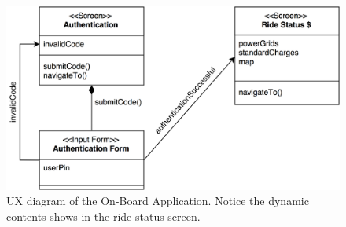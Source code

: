 \begin{figure}[H]
\begin{center}
		\includegraphics[width=\textwidth]{./user_interface_design/diagrams/on_board_ux.png}
		\caption{UX diagram of the On-Board Application. Notice the dynamic contents shows in the ride status screen.}
		\label{web_mobile_ux}
\end{center}
\end{figure}